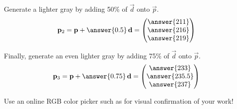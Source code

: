 \documentclass{ximera}
\begin{document}
\begin{exercise}
  Generate a lighter gray by adding 50\% of $\vec{d}$ onto $\vec{p}$.
  \[
    \vec{p}_2 = \vec{p} + \answer{0.5}\,\vec{d} =
    \begin{pmatrix}
      \answer{211}\\
      \answer{216}\\
      \answer{219}
    \end{pmatrix}
  \]

  Finally, generate an even lighter gray by adding 75\% of $\vec{d}$
  onto $\vec{p}$.
  \[
    \vec{p}_3 = \vec{p} + \answer{0.75}\,\vec{d} =
    \begin{pmatrix}
      \answer{233}\\
      \answer{235.5}\\
      \answer{237}
    \end{pmatrix}
  \]

  \begin{feedback}[correct]
    Use an online RGB color picker such as
     for visual confirmation of
    your work!
  \end{feedback}

%
%

\end{exercise}
\end{document}
